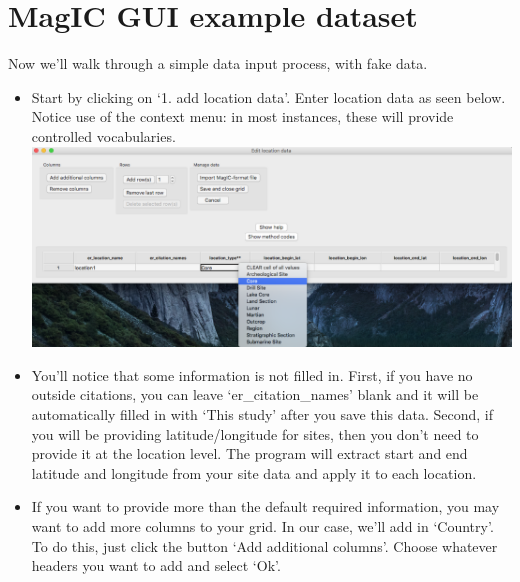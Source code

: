 \documentclass[11pt]{book}
\begin{document}
{\section{MagIC GUI example dataset}
Now we'll walk through a simple data input process, with fake data.
  \begin{itemize}
  \item Start by clicking on `1. add location data'.  Enter location data as seen below. Notice use of the context menu: in most instances, these will provide controlled vocabularies.
    \includegraphics[width=40cm]{EPSfiles/MM_location_grid_with_menu.eps}
  \item You'll notice that some information is not filled in.  First, if you have no outside citations, you can leave `er\_citation\_names' blank and it will be automatically filled in with `This study' after you save this data.  Second, if you will be providing latitude/longitude for sites, then you don't need to provide it at the location level.  The program will extract start and end latitude and longitude from your site data and apply it to each location.
  \item If you want to provide more than the default required information, you may want to add more columns to your grid.  In our case, we'll add in `Country'.  To do this, just click the button `Add additional columns'.  Choose whatever headers you want to add and select `Ok'.


\end{itemize}}
\end{document}
